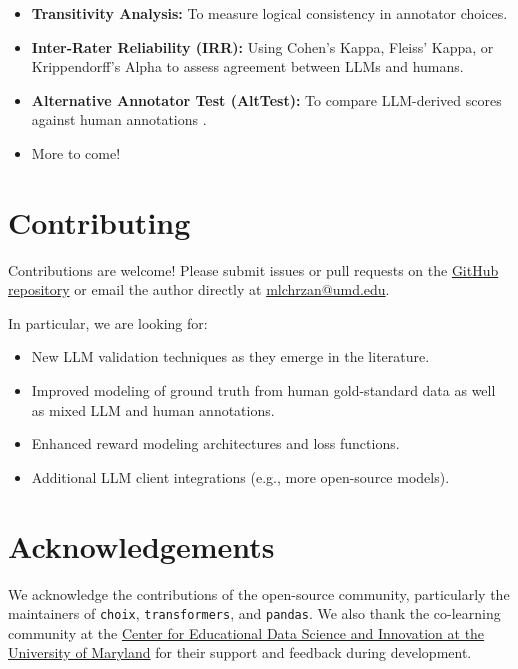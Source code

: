 \documentclass[11pt]{article}
\begin{document}
\begin{itemize}
    \item \textbf{Transitivity Analysis:} To measure logical consistency in annotator choices.
    \item \textbf{Inter-Rater Reliability (IRR):} Using Cohen's Kappa, Fleiss' Kappa, or Krippendorff's Alpha to assess agreement between LLMs and humans.
    \item \textbf{Alternative Annotator Test (AltTest):} To compare LLM-derived scores against human annotations \citep{calderon:2025}.
    \item More to come!
\end{itemize}

\section{Contributing}
Contributions are welcome! Please submit issues or pull requests on the \href{https://github.com/mlchrzan/pairadigm}{GitHub repository} or email the author directly at \href{mailto:mlchrzan@umd.edu}{mlchrzan@umd.edu}. 

In particular, we are looking for:

\begin{itemize}
    \item New LLM validation techniques as they emerge in the literature.
    \item Improved modeling of ground truth from human gold-standard data as well as mixed LLM and human annotations.
    \item Enhanced reward modeling architectures and loss functions.
    \item Additional LLM client integrations (e.g., more open-source models).
\end{itemize}

\section{Acknowledgements}
We acknowledge the contributions of the open-source community, particularly the maintainers of \texttt{choix}, \texttt{transformers}, and \texttt{pandas}. We also thank the co-learning community at the \href{https://edsi.umd.edu/}{Center for Educational Data Science and Innovation at the University of Maryland} for their support and feedback during development.




\end{document}
